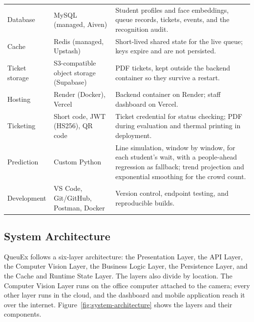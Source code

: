 \documentclass{research}
\newcommand{\sysname}{QueuEx}
\begin{document}
\begin{table}[!htbp]
\begin{tabular}{p{2.3cm} p{3.4cm} p{7.4cm}}
    Database & MySQL (managed, Aiven) &
      Student profiles and face embeddings, queue records, tickets,
      events, and the recognition audit. \\
    Cache & Redis (managed, Upstash) &
      Short-lived shared state for the live queue; keys expire and are
      not persisted. \\
    Ticket storage & S3-compatible object storage (Supabase) &
      PDF tickets, kept outside the backend container so they survive a
      restart. \\
    Hosting & Render (Docker), Vercel &
      Backend container on Render; staff dashboard on Vercel. \\
    Ticketing & Short code, JWT (HS256), QR code &
      Ticket credential for status checking; PDF during evaluation and
      thermal printing in deployment. \\
    Prediction & Custom Python &
      Line simulation, window by window, for each student's wait, with a
      people-ahead regression as fallback; trend projection and
      exponential smoothing for the crowd count. \\
    Development & VS Code, Git/GitHub, Postman, Docker &
      Version control, endpoint testing, and reproducible builds. \\
    \bottomrule
  \end{tabular}
\end{table}


\subsection{System Architecture}
\label{sec:architecture}

\sysname{} follows a six-layer architecture: the Presentation Layer, the
API Layer, the Computer Vision Layer, the Business Logic Layer, the
Persistence Layer, and the Cache and Runtime State Layer. The layers also
divide by location. The Computer Vision Layer runs on the office computer
attached to the camera; every other layer runs in the cloud, and the
dashboard and mobile application reach it over the internet.
Figure~\ref{fig:system-architecture} shows the layers and their
components.
\end{document}
